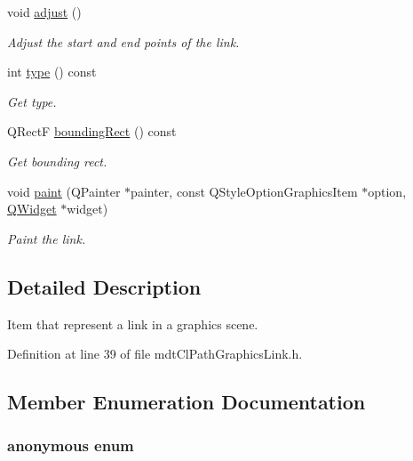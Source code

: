 \begin{DoxyCompactItemize}
void \hyperlink{classmdt_cl_path_graphics_link_aca6ea2d8ae9944b2739865072170c812}{adjust} ()
\begin{DoxyCompactList}\small\item\em Adjust the start and end points of the link. \end{DoxyCompactList}\item 
int \hyperlink{classmdt_cl_path_graphics_link_ab2f102d6d2dcac5da1e62188f19dbfcd}{type} () const 
\begin{DoxyCompactList}\small\item\em Get type. \end{DoxyCompactList}\item 
Q\-Rect\-F \hyperlink{classmdt_cl_path_graphics_link_a282899cce5aff82c7f1ff057dfd2a7e5}{bounding\-Rect} () const 
\begin{DoxyCompactList}\small\item\em Get bounding rect. \end{DoxyCompactList}\item 
void \hyperlink{classmdt_cl_path_graphics_link_a7a50d75bff40311438d59a4ebb4302f8}{paint} (Q\-Painter $\ast$painter, const Q\-Style\-Option\-Graphics\-Item $\ast$option, \hyperlink{class_q_widget}{Q\-Widget} $\ast$widget)
\begin{DoxyCompactList}\small\item\em Paint the link. \end{DoxyCompactList}\end{DoxyCompactItemize}


\subsection{Detailed Description}
Item that represent a link in a graphics scene. 

Definition at line 39 of file mdt\-Cl\-Path\-Graphics\-Link.\-h.



\subsection{Member Enumeration Documentation}
\hypertarget{classmdt_cl_path_graphics_link_a46597cdad57cbb1d9d5be6dccb671512}{\subsubsection[{anonymous enum}]{\setlength{\rightskip}{0pt plus 5cm}anonymous enum}}\label{classmdt_cl_path_graphics_link_a46597cdad57cbb1d9d5be6dccb671512}


